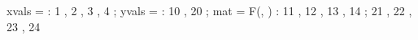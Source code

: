 \begin{functable}
    xvals = \alpha : 1  , 2  , 3  , 4 ;
    yvals = \beta  : 10 , 20 ;
    mat = {F(\alpha, \beta )} : 11 , 12 , 13 , 14 ;
                                21 , 22 , 23 , 24 
\end{functable}
